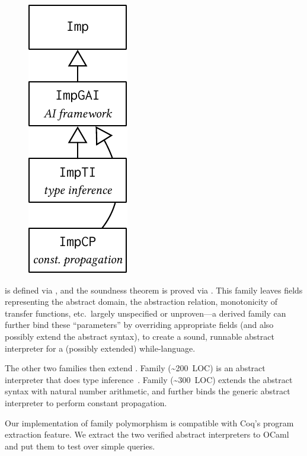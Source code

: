 \begin{figure}
\includegraphics[scale=.68]{graphics/ai-casestudy.pdf}
\end{figure}

\noindent
{} is defined via , and the soundness theorem
is proved via .
This family leaves fields representing the abstract domain, the
abstraction relation, monotonicity of transfer functions, etc.\ 
largely unspecified or unproven---a derived family can further bind
these ``parameters'' by overriding appropriate fields (and also possibly
extend the abstract syntax), to create a sound, runnable abstract
interpreter for a (possibly extended) while-language.

The other two families then extend .
Family  (\textasciitilde200~LOC) is an abstract
interpreter that does type inference~\cite{cousot1997types}.
Family  (\textasciitilde300~LOC) extends the abstract syntax
with natural number arithmetic,
and further binds the generic abstract interpreter to perform constant propagation.

Our implementation of family polymorphism is compatible with Coq's
program extraction feature.
We extract the two verified abstract interpreters to OCaml
and put them to test over simple queries. %

